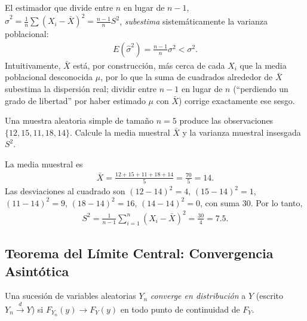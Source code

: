\begin{observacion}
El estimador que divide entre $n$ en lugar de $n-1$, $\hat{\sigma}^2 =
\frac{1}{n}\sum(X_i-\bar{X})^2 = \frac{n-1}{n}S^2$, \emph{subestima}
sistem\'aticamente la varianza poblacional:
\begin{align}
 E(\hat{\sigma}^2) = \frac{n-1}{n}\sigma^2 < \sigma^2.
\end{align}
Intuitivamente, $\bar{X}$ est\'a, por construcci\'on, m\'as cerca de cada $X_i$ que la
media poblacional desconocida $\mu$, por lo que la suma de cuadrados alrededor de
$\bar{X}$ subestima la dispersi\'on real; dividir entre $n-1$ en lugar de $n$
(``perdiendo un grado de libertad'' por haber estimado $\mu$ con $\bar{X}$) corrige
exactamente ese sesgo.
\end{observacion}

\begin{ejemplo}
 \label{exmp:sample-mean-and-unbiased-variance}
Una muestra aleatoria simple de tama\~no $n=5$ produce las observaciones
$\{12, 15, 11, 18, 14\}$. Calcule la media muestral $\bar{X}$ y la varianza muestral
insesgada $S^2$.
\end{ejemplo}

\begin{solucion}
La media muestral es
\begin{align}
 \bar{X} = \frac{12+15+11+18+14}{5} = \frac{70}{5} = 14.
\end{align}
Las desviaciones al cuadrado son $(12-14)^2=4$, $(15-14)^2=1$, $(11-14)^2=9$,
$(18-14)^2=16$, $(14-14)^2=0$, con suma $30$. Por lo tanto,
\begin{align}
 S^2 = \frac{1}{n-1}\sum_{i=1}^n (X_i-\bar{X})^2 = \frac{30}{4} = 7.5.
\end{align}
\end{solucion}




\subsection{Teorema del Límite Central: Convergencia Asintótica}

\begin{definicion}
Una sucesi\'on de variables aleatorias $Y_n$ \emph{converge en distribuci\'on} a $Y$
(escrito $Y_n \xrightarrow{d} Y$) si $F_{Y_n}(y) \to F_Y(y)$ en todo punto de
continuidad de $F_Y$.
\end{definicion}

